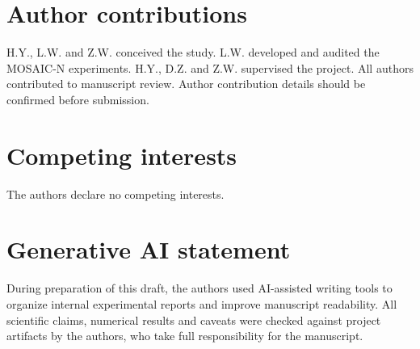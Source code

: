 \documentclass[unnumsec,webpdf,contemporary,large,numbered]{oup-authoring-template}
\begin{document}
\section{Author contributions}

H.Y., L.W. and Z.W. conceived the study. L.W. developed and audited the MOSAIC-N experiments. H.Y., D.Z. and Z.W. supervised the project. All authors contributed to manuscript review. Author contribution details should be confirmed before submission.

\section{Competing interests}

The authors declare no competing interests.

\section{Generative AI statement}

During preparation of this draft, the authors used AI-assisted writing tools to organize internal experimental reports and improve manuscript readability. All scientific claims, numerical results and caveats were checked against project artifacts by the authors, who take full responsibility for the manuscript.



\end{document}
